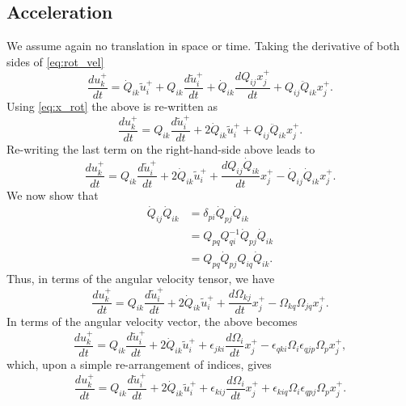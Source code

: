 \documentclass[oneside,a4paper,11pt]{report}
\begin{document}
\subsection{Acceleration}
We assume again no translation in space or time. Taking the derivative of both sides of \cref{eq:rot_vel}
\begin{equation}
    \frac{du^+_k}{dt} = \dot{Q}_{ik} \tilde{u}^+_i + Q_{ik} \frac{d\tilde{u}^+_i}{dt} + \dot{Q}_{ik} \frac{dQ_{ij} x^+_j}{dt} + Q_{ij}\ddot{Q}_{ik} x^+_j.
\end{equation}
Using \cref{eq:x_rot} the above is re-written as
\begin{equation}
    \frac{du^+_k}{dt} = Q_{ik} \frac{d\tilde{u}^+_i}{dt} + 2 \dot{Q}_{ik} \tilde{u}^+_i + Q_{ij}\ddot{Q}_{ik} x^+_j.
\end{equation}
Re-writing the last term on the right-hand-side above leads to
\begin{equation}
    \frac{du^+_k}{dt} = Q_{ik} \frac{d\tilde{u}^+_i}{dt} + 2 \dot{Q}_{ik} \tilde{u}^+_i + \frac{d Q_{ij}\dot{Q}_{ik}}{dt} x^+_j - \dot{Q}_{ij} \dot{Q}_{ik} x^+_j.
\end{equation}
We now show that
\begin{align}
    \dot{Q}_{ij} \dot{Q}_{ik} & = \delta_{pi}\dot{Q}_{pj} \dot{Q}_{ik}  \nonumber \\
    & = Q_{pq}Q^{-1}_{qi} \dot{Q}_{pj} \dot{Q}_{ik}  \nonumber \\
    & = Q_{pq} \dot{Q}_{pj} Q_{iq} \dot{Q}_{ik} .
\end{align}
Thus, in terms of the angular velocity tensor, we have
\begin{equation}
    \frac{du^+_k}{dt} = Q_{ik} \frac{d\tilde{u}^+_i}{dt} + 2 \dot{Q}_{ik} \tilde{u}^+_i + \frac{d \Omega_{kj}}{dt} x^+_j - \Omega_{kq} \Omega_{jq} x^+_j.
\end{equation}
In terms of the angular velocity vector, the above becomes
\begin{equation}
    \frac{du^+_k}{dt} = Q_{ik} \frac{d\tilde{u}^+_i}{dt} + 2 \dot{Q}_{ik} \tilde{u}^+_i + \epsilon_{jki}\frac{d \Omega_{i}}{dt} x^+_j - \epsilon_{qki}\Omega_{i} \epsilon_{qjp}\Omega_{p} x^+_j,
\end{equation}
which, upon a simple re-arrangement of indices, gives
\begin{equation}
\label{eq:rot_acl_angular_vector}
    \frac{du^+_k}{dt} = Q_{ik} \frac{d\tilde{u}^+_i}{dt} + 2 \dot{Q}_{ik} \tilde{u}^+_i + \epsilon_{kij}\frac{d \Omega_{i}}{dt} x^+_j + \epsilon_{kiq}\Omega_{i} \epsilon_{qpj}\Omega_{p} x^+_j.
\end{equation}
\end{document}
